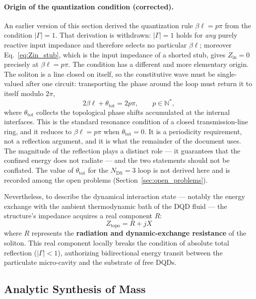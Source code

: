 \documentclass[11pt,a4paper]{article}
\theoremstyle{plain}
\theoremstyle{remark}
\newcommand{\Ncd}{\ensuremath{N_{\mathrm{DS}}}}
\begin{document}
\paragraph{Origin of the quantization condition (corrected).} An earlier version of this section derived the quantization rule $\beta\ell = p\pi$ from the condition $|\Gamma| = 1$. That derivation is withdrawn: $|\Gamma| = 1$ holds for \emph{any} purely reactive input impedance and therefore selects no particular $\beta\ell$; moreover Eq.~\eqref{eq:Zin_stub}, which is the input impedance of a shorted stub, gives $Z_{\text{in}} = 0$ precisely at $\beta\ell = p\pi$. The condition has a different and more elementary origin. The soliton is a line closed on itself, so the constitutive wave must be single-valued after one circuit: transporting the phase around the loop must return it to itself modulo $2\pi$,
\begin{equation}\label{eq:single_valued}
2\beta\ell + \theta_{\text{tot}} = 2p\pi , \qquad p \in \mathbb{N}^*,
\end{equation}
where $\theta_{\text{tot}}$ collects the topological phase shifts accumulated at the internal interfaces. This is the standard resonance condition of a closed transmission-line ring, and it reduces to $\beta\ell = p\pi$ when $\theta_{\text{tot}} = 0$. It is a periodicity requirement, not a reflection argument, and it is what the remainder of the document uses. The magnitude of the reflection plays a distinct role --- it guarantees that the confined energy does not radiate --- and the two statements should not be conflated. The value of $\theta_{\text{tot}}$ for the $\Ncd = 3$ loop is not derived here and is recorded among the open problems (Section~\ref{sec:open_problems}).

Nevertheless, to describe the dynamical interaction state --- notably the energy exchange with the ambient thermodynamic bath of the DQD fluid --- the structure's impedance acquires a real component $R$:
\begin{equation}
Z_{\text{topo}} = R + jX
\end{equation}
where $R$ represents the \textbf{radiation and dynamic-exchange resistance} of the soliton. This real component locally breaks the condition of absolute total reflection ($|\Gamma| < 1$), authorizing bidirectional energy transit between the particulate micro-cavity and the substrate of free DQDs.

\subsection{Analytic Synthesis of Mass}
\end{document}
